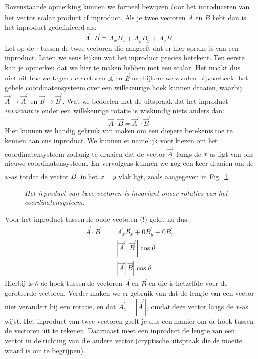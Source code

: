 Bovenstaande opmerking kunnen we formeel bewijzen door het introduceren van het vector scalar product of inproduct. Als je twee vectoren $\vec{A}$ en $\vec{B}$ hebt dan is het inproduct gedefinieerd als:
\begin{equation}
\vec{A}\cdot\vec{B} \equiv A_x B_x + A_y B_y + A_z B_z
\end{equation}
Let op de $\cdot$ tussen de twee vectoren die aangeeft dat er hier sprake is van een inproduct.
Laten we eens kijken wat het inproduct precies betekent. Ten eerste kan je opmerken dat we hier te maken hebben met een scalar. Het maakt dus niet uit hoe we tegen de vectoren $\vec{A}$ en $\vec{B}$ aankijken: we zouden bijvoorbeeld het gehele coordinatensysteem over een willekeurige hoek kunnen
draaien, waarbij $\vec{A}\rightarrow\vec{A}^{'}$ en $\vec{B}\rightarrow\vec{B}^{'}$. Wat we bedoelen met de uitspraak dat het inproduct {\it invariant} is onder een willekeurige rotatie is wiskundig niets anders dan:
\begin{equation}
\vec{A}\cdot\vec{B} = \vec{A}^{'}\cdot\vec{B}^{'}
\end{equation}
Hier kunnen we handig gebruik van maken om een diepere betekenis toe te kennen aan ons inproduct. We kunnen er namelijk voor kiezen om het coordinatensysteem zodanig te draaien dat de vector $\vec{A}^{'}$ langs de $x$-as ligt van ons nieuwe coordinatensysteem. En vervolgens kunnen we nog een keer draaien om de $x$-as totdat de vector $\vec{B}^{'}$ in het $x-y$ vlak ligt, zoals aangegeven in Fig.~\ref{fig:inproduct}.
\begin{figure}[htbp]
\begin{center}
\caption{{\it Het inproduct van twee vectoren is invariant onder rotaties van het coordinatensysteem. }}
\label{fig:inproduct}
\end{center}
\end{figure} 
Voor het inproduct tussen de oude vectoren (!) geldt nu dus:
\begin{eqnarray}
\vec{A}\cdot\vec{B} & = & A_x^{'} B_x^{'} + 0 B_y^{'} + 0 B_z^{'} \\
                                   & = & |\vec{A}^{'}| |\vec{B}^{'}| \cos\theta^{'} \\
                                   & = & |\vec{A}||\vec{B}|\cos\theta \label{eq:inpr}
\end{eqnarray}
Hierbij is $\theta$ de hoek tussen de vectoren $\vec{A}$ en $\vec{B}$ en die is hetzelfde voor de geroteerde vectoren. Verder maken we er  gebruik van dat de lengte van een vector niet verandert bij een rotatie, en dat $A_x^{'}=|\vec{A}^{'}|$, omdat  deze vector langs de $x$-as wijst. Het inproduct van twee vectoren geeft je dus een manier om de hoek tussen de vectoren uit te rekenen. Daarnaast meet een inproduct de lengte van een vector in de richting van die andere vector (cryptische uitspraak die de moeite waard is om te begrijpen). 

